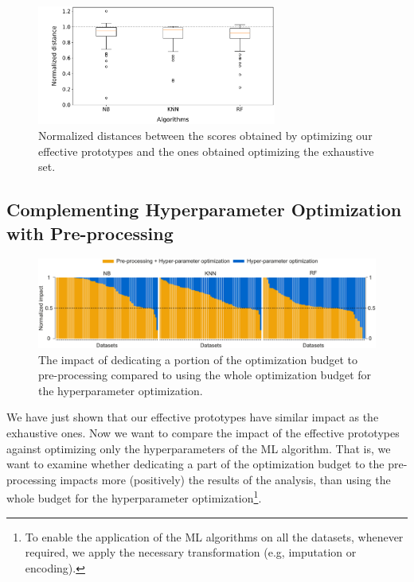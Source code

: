 \begin{figure}[!t]
    \centering
    \includegraphics[width=0.7\textwidth]{chapters/data-centric/supervised/img/evaluation2.pdf}
    \caption{Normalized distances between the scores obtained by optimizing our effective prototypes and the ones obtained optimizing the exhaustive set.}
    \label{effective-fig:eval-exhaustive-vs-effective}
\end{figure}

\subsection{Complementing Hyperparameter Optimization with Pre-processing}
\label{effective-sec:eval-dpso-vs-cash}

\begin{figure}[!t]
	\centering
	\includegraphics[width=1.0\textwidth]{chapters/data-centric/supervised/img/barplot-10.pdf}
	\caption{The impact of dedicating a portion of the optimization budget to pre-processing compared to using the whole optimization budget for the hyperparameter optimization.}
	\label{effective-fig:eval-pre-processing-hyperparameter}
\end{figure}

We have just shown that our effective prototypes have similar impact as the exhaustive ones.
Now we want to compare the impact of the effective prototypes against optimizing only the hyperparameters of the ML algorithm.
That is, we want to examine whether dedicating a part of the optimization budget to the pre-processing impacts more (positively) the results of the analysis, than using the whole budget for the hyperparameter optimization\footnote{To enable the application of the ML algorithms on all the datasets, whenever required, we apply the necessary transformation (e.g, imputation or encoding).}.

